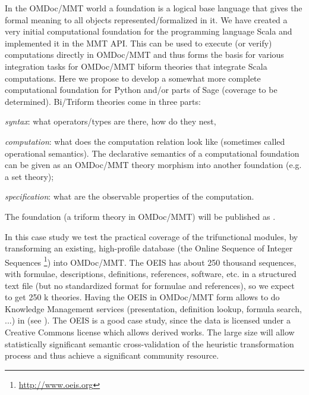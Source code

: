 \begin{workpackage}[id=dksbases,%
  title=Data/Knowledge/Software-Bases,lead=JU,
  ZHRM=12,JURM=46,UWRM=25,SARM=10,LLRM=2,PSRM=4]
\begin{tasklist}
\begin{task}[title=Computational Foundation for Python/Sage,
  id=data-foundationCAS,lead=JU,partners={ZH,SA},PM=9,wphases=6-18!.66]
  In the OMDoc/MMT world a foundation is a logical base language that gives the formal
  meaning to all objects represented/formalized in it. We have created a very initial
  computational foundation for the programming language Scala and implemented it in the MMT API. This can be used
  to execute (or verify) computations directly in OMDoc/MMT and thus forms the basis for
  various integration tasks for OMDoc/MMT biform theories that integrate Scala
  computations. Here we propose to develop a somewhat more complete computational
  foundation for Python and/or parts of Sage (coverage to be determined). Bi/Triform
  theories come in three parts:
  \begin{compactitem}
  \item \emph{syntax}: what operators/types are there, how do they nest,
  \item \emph{computation}: what does the computation relation look like (sometimes called
    operational semantics). The declarative semantics of a computational foundation can be
    given as an OMDoc/MMT theory morphism into another foundation (e.g. a set theory);
  \item \emph{specification}: what are the observable properties of the computation. 
  \end{compactitem}
  The foundation (a triform theory in OMDoc/MMT) will be published as
  .
\end{task}

\begin{task}[title=OEIS Case Study (Coverage and automated Import),id=data-OEIS,lead=JU
,PM=6,wphases=12-18]
In this case study we test the practical coverage of the trifunctional modules, by
transforming an existing, high-profile database (the Online Sequence of Integer Sequences
\footnote{\url{http://www.oeis.org}}) into OMDoc/MMT. The OEIS has about 250 thousand sequences, with
formulae, descriptions, definitions, references, software, etc. in a structured text file
(but no standardized format for formulae and references), so we expect to get 250 k
theories. Having the OEIS in OMDoc/MMT form allows to do Knowledge Management services
(presentation, definition lookup, formula search, ...) in \MathHub (see ). The
OEIS is a good case study, since the data is licensed under a Creative Commons license
which allows derived works. The large size will allow statistically significant semantic
cross-validation of the heuristic transformation process and thus achieve a significant
community resource.


\end{task}
\end{tasklist}
\end{workpackage}
